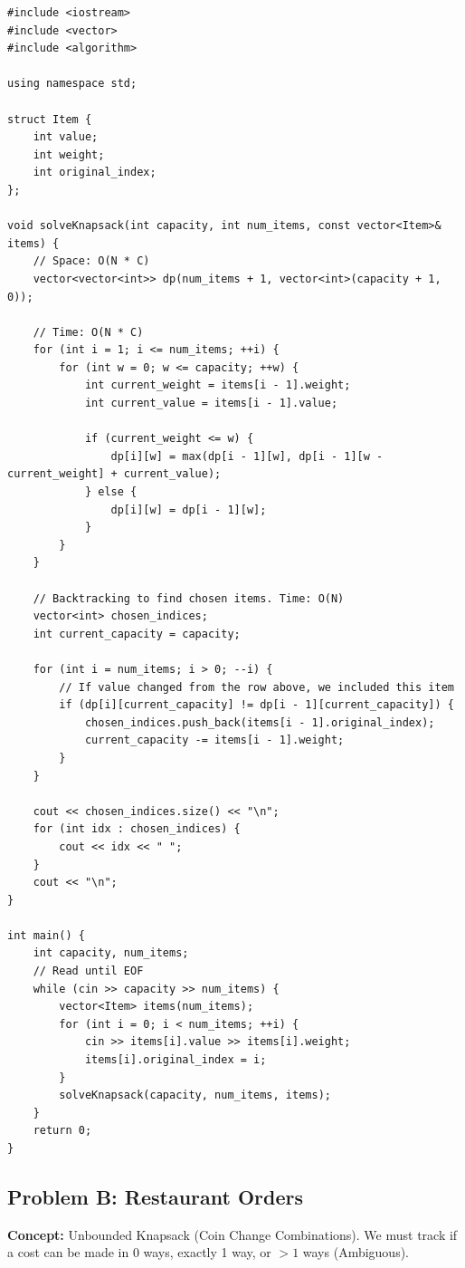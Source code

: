 \begin{lstlisting}
#include <iostream>
#include <vector>
#include <algorithm>

using namespace std;

struct Item {
    int value;
    int weight;
    int original_index;
};

void solveKnapsack(int capacity, int num_items, const vector<Item>& items) {
    // Space: O(N * C)
    vector<vector<int>> dp(num_items + 1, vector<int>(capacity + 1, 0));
    
    // Time: O(N * C)
    for (int i = 1; i <= num_items; ++i) {
        for (int w = 0; w <= capacity; ++w) {
            int current_weight = items[i - 1].weight;
            int current_value = items[i - 1].value;
            
            if (current_weight <= w) {
                dp[i][w] = max(dp[i - 1][w], dp[i - 1][w - current_weight] + current_value);
            } else {
                dp[i][w] = dp[i - 1][w];
            }
        }
    }
    
    // Backtracking to find chosen items. Time: O(N)
    vector<int> chosen_indices;
    int current_capacity = capacity;
    
    for (int i = num_items; i > 0; --i) {
        // If value changed from the row above, we included this item
        if (dp[i][current_capacity] != dp[i - 1][current_capacity]) {
            chosen_indices.push_back(items[i - 1].original_index);
            current_capacity -= items[i - 1].weight;
        }
    }
    
    cout << chosen_indices.size() << "\n";
    for (int idx : chosen_indices) {
        cout << idx << " ";
    }
    cout << "\n";
}

int main() {
    int capacity, num_items;
    // Read until EOF
    while (cin >> capacity >> num_items) {
        vector<Item> items(num_items);
        for (int i = 0; i < num_items; ++i) {
            cin >> items[i].value >> items[i].weight;
            items[i].original_index = i;
        }
        solveKnapsack(capacity, num_items, items);
    }
    return 0;
}
\end{lstlisting}

\subsection{Problem B: Restaurant Orders}
\textbf{Concept:} Unbounded Knapsack (Coin Change Combinations). We must track if a cost can be made in 0 ways, exactly 1 way, or $>1$ ways (Ambiguous).

